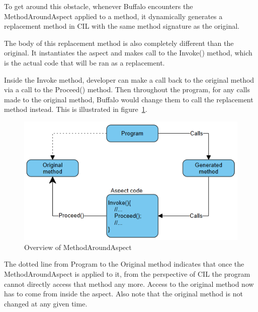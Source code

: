 To get around this obstacle, whenever Buffalo encounters the MethodAroundAspect applied to a method, it dynamically generates a replacement method in CIL with the same method signature as the original.

The body of this replacement method is also completely different than the original. It instantiates the aspect and makes call to the Invoke() method, which is the actual code that will be ran as a replacement. 

Inside the Invoke method, developer can make a call back to the original method via a call to the Proceed() method. Then throughout the program, for any calls made to the original method, Buffalo would change them to call the replacement method instead. This is illustrated in figure~\ref{around_overview}.

\begin{figure}[H]
  \includegraphics[scale=1.0]{AroundOverview2.PNG}
  \centering
  \caption{Overview of MethodAroundAspect\label{around_overview}}
\end{figure}

The dotted line from Program to the Original method indicates that once the MethodAroundAspect is applied to it, from the perspective of CIL the program cannot directly access that method any more. Access to the original method now has to come from inside the aspect. Also note that the original method is not changed at any given time.
